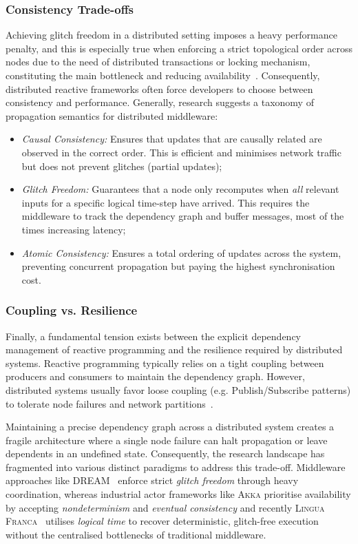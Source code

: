 \subsubsection{Consistency Trade-offs}
Achieving glitch freedom in a distributed setting imposes a heavy performance
penalty, and this is especially true when enforcing a strict topological order
across nodes due to the need of distributed transactions or locking mechanism,
constituting the main bottleneck and reducing
availability~\cite{margara2014DREAM}. Consequently, distributed reactive
frameworks often force developers to choose between consistency and
performance. Generally, research suggests a taxonomy of propagation semantics
for distributed middleware:
\begin{itemize}
	\item \emph{Causal Consistency:} Ensures that updates that are causally
	      related are observed in the correct order. This is efficient and
	      minimises network traffic but does not prevent glitches (partial
	      updates);
	\item \emph{Glitch Freedom:} Guarantees that a node only recomputes when
	      \emph{all} relevant inputs for a specific logical time-step have
	      arrived. This requires the middleware to track the dependency graph and
	      buffer messages, most of the times increasing latency;
	\item \emph{Atomic Consistency:} Ensures a total ordering of updates across
	      the system, preventing concurrent propagation but paying the highest
	      synchronisation cost.
\end{itemize}

\subsubsection{Coupling vs. Resilience}
Finally, a fundamental tension exists between the explicit dependency
management of reactive programming and the resilience required by distributed
systems. Reactive programming typically relies on a tight coupling between
producers and consumers to maintain the dependency graph. However, distributed
systems usually favor loose coupling (e.g. Publish/Subscribe patterns) to
tolerate node failures and network partitions~\cite{bainomugisha2013SRP}.

Maintaining a precise dependency graph across a distributed system creates a
fragile architecture where a single node failure can halt propagation or leave
dependents in an undefined state. Consequently, the research landscape has
fragmented into various distinct paradigms to address this trade-off.
Middleware approaches like \textsc{DREAM}~\cite{margara2014DREAM} enforce
strict \emph{glitch freedom} through heavy coordination, whereas industrial
actor frameworks like \textsc{Akka} prioritise availability by accepting
\emph{nondeterminism} and \emph{eventual consistency} and recently
\textsc{Lingua Franca}~\cite{menard2023LF} utilises \emph{logical time} to
recover deterministic, glitch-free execution without the centralised
bottlenecks of traditional middleware.


